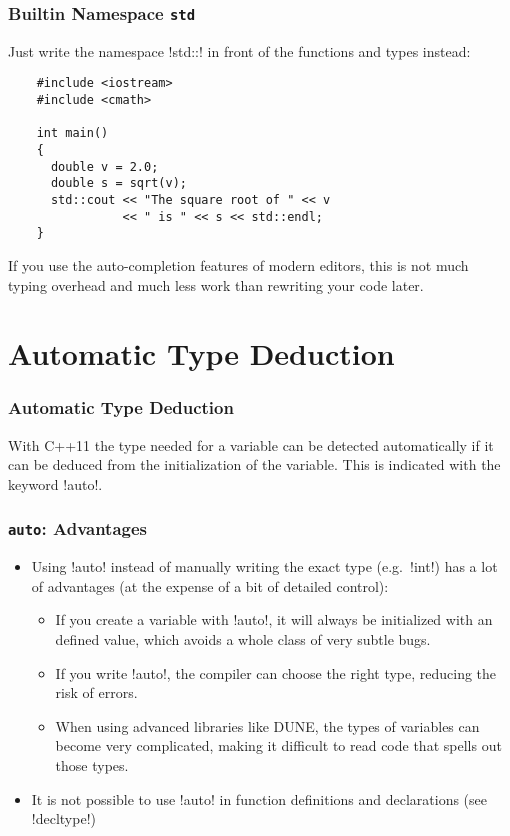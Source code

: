 \begin{frame}[fragile]
  \frametitle<presentation>{Builtin Namespace \texttt{std}}
Just write the namespace \inline!std::! in front of the functions and types instead:
  \begin{lstlisting}
    #include <iostream>
    #include <cmath>

    int main()
    {
      double v = 2.0;
      double s = sqrt(v);
      std::cout << "The square root of " << v
                << " is " << s << std::endl;
    }
  \end{lstlisting}
  If you use the auto-completion features of modern editors, this is not much typing overhead and much less work than rewriting your code later.
\end{frame}

\section{Automatic Type Deduction}

\begin{frame}
\frametitle<presentation>{Automatic Type Deduction}

With C++11 the type needed for a variable can be detected automatically if it can be deduced from the initialization of the variable. This is indicated with the keyword \inline!auto!.



\end{frame}

\begin{frame}[fragile]
\frametitle{\texttt{auto}: Advantages}

\begin{itemize}
\item Using \inline!auto! instead of manually writing the exact type (e.g.~\inline!int!) has a lot of advantages (at the expense of a bit of detailed control):
\begin{itemize}
\item If you create a variable with \inline!auto!, it will always be initialized with an defined value, which avoids a whole class of very subtle bugs.
\item If you write \inline!auto!, the compiler can choose the right type, reducing the risk of errors.
\item When using advanced libraries like DUNE, the types of variables can become very complicated, making it difficult to read code that spells out those types.
\end{itemize}
\item It is not possible to use \inline!auto! in function definitions and declarations (see \inline!decltype!)
\end{itemize}

\end{frame}

